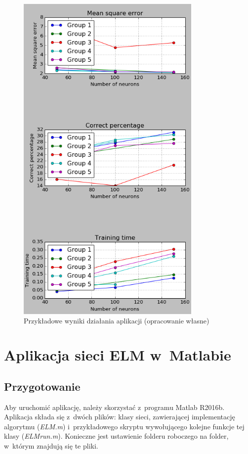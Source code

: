 \documentclass[pl]{minipw} %
\begin{document}
\begin{figure}[H]
\centering
\includegraphics[width=0.8\textwidth]{instrukcja_python_end.png}
\caption[Przykładowe wyniki działania aplikacji]{Przykładowe wyniki działania aplikacji (opracowanie własne)}
\label{instrukcja_python_end}
\end{figure}
\clearpage
\section*{Aplikacja sieci ELM w~Matlabie}
\subsection*{Przygotowanie}
Aby uruchomić aplikację, należy skorzystać z~programu Matlab R2016b.
Aplikacja składa się z~dwóch plików: klasy sieci, zawierającej implementację algorytmu (\textit{ELM.m}) i~przykładowego skryptu wywołującego kolejne funkcje tej klasy (\textit{ELM\textunderscore run.m}).
Konieczne jest ustawienie folderu roboczego na folder, w~którym znajdują się te pliki.
\end{document}
